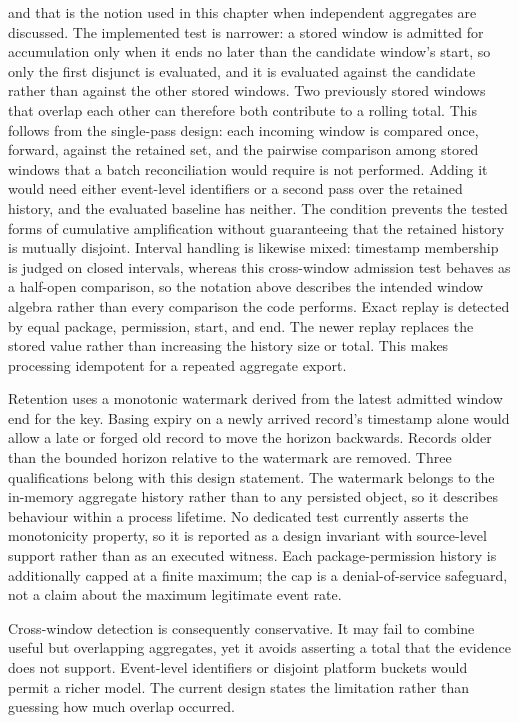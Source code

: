 and that is the notion used in this chapter when independent aggregates are discussed. The implemented test is narrower: a stored window is admitted for accumulation only when it ends no later than the candidate window's start, so only the first disjunct is evaluated, and it is evaluated against the candidate rather than against the other stored windows. Two previously stored windows that overlap each other can therefore both contribute to a rolling total. This follows from the single-pass design: each incoming window is compared once, forward, against the retained set, and the pairwise comparison among stored windows that a batch reconciliation would require is not performed. Adding it would need either event-level identifiers or a second pass over the retained history, and the evaluated baseline has neither. The condition prevents the tested forms of cumulative amplification without guaranteeing that the retained history is mutually disjoint. Interval handling is likewise mixed: timestamp membership is judged on closed intervals, whereas this cross-window admission test behaves as a half-open comparison, so the notation above describes the intended window algebra rather than every comparison the code performs. Exact replay is detected by equal package, permission, start, and end. The newer replay replaces the stored value rather than increasing the history size or total. This makes processing idempotent for a repeated aggregate export.

Retention uses a monotonic watermark derived from the latest admitted window end for the key. Basing expiry on a newly arrived record's timestamp alone would allow a late or forged old record to move the horizon backwards. Records older than the bounded horizon relative to the watermark are removed. Three qualifications belong with this design statement. The watermark belongs to the in-memory aggregate history rather than to any persisted object, so it describes behaviour within a process lifetime. No dedicated test currently asserts the monotonicity property, so it is reported as a design invariant with source-level support rather than as an executed witness. Each package-permission history is additionally capped at a finite maximum; the cap is a denial-of-service safeguard, not a claim about the maximum legitimate event rate.

Cross-window detection is consequently conservative. It may fail to combine useful but overlapping aggregates, yet it avoids asserting a total that the evidence does not support. Event-level identifiers or disjoint platform buckets would permit a richer model. The current design states the limitation rather than guessing how much overlap occurred.

